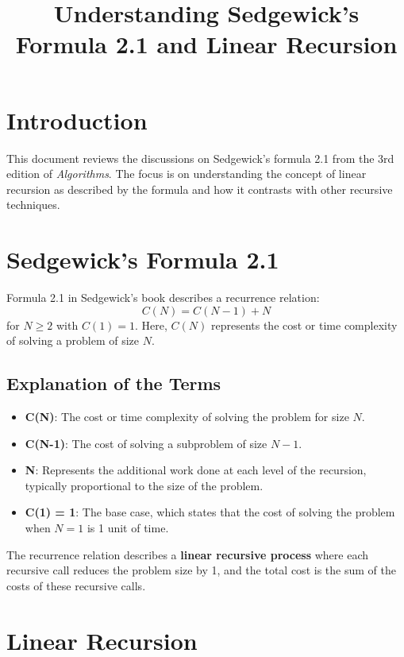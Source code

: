 \documentclass{article}
\title{Understanding Sedgewick's Formula 2.1 and Linear Recursion}
\author{}
\date{}
\begin{document}
\maketitle

\section{Introduction}

This document reviews the discussions on Sedgewick's formula 2.1 from the 3rd edition of \textit{Algorithms}. The focus is on understanding the concept of linear recursion as described by the formula and how it contrasts with other recursive techniques.

\section{Sedgewick's Formula 2.1}

Formula 2.1 in Sedgewick's book describes a recurrence relation:
\[
C(N) = C(N-1) + N
\]
for $N \geq 2$ with $C(1) = 1$. Here, $C(N)$ represents the cost or time complexity of solving a problem of size $N$.

\subsection{Explanation of the Terms}

\begin{itemize}
    \item \textbf{C(N)}: The cost or time complexity of solving the problem for size $N$.
    \item \textbf{C(N-1)}: The cost of solving a subproblem of size $N-1$.
    \item \textbf{N}: Represents the additional work done at each level of the recursion, typically proportional to the size of the problem.
    \item \textbf{C(1) = 1}: The base case, which states that the cost of solving the problem when $N = 1$ is 1 unit of time.
\end{itemize}

The recurrence relation describes a \textbf{linear recursive process} where each recursive call reduces the problem size by 1, and the total cost is the sum of the costs of these recursive calls.

\section{Linear Recursion}
\end{document}
